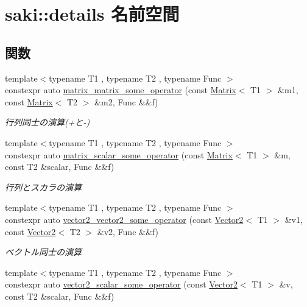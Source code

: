 \hypertarget{namespacesaki_1_1details}{}\section{saki\+:\+:details 名前空間}
\label{namespacesaki_1_1details}
\subsection*{関数}
\begin{DoxyCompactItemize}
\item 
{\footnotesize template$<$typename T1 , typename T2 , typename Func $>$ }\\constexpr auto \mbox{\hyperlink{namespacesaki_1_1details_ab331ad2e5330aa422492d228d522aeea}{matrix\+\_\+matrix\+\_\+some\+\_\+operator}} (const \mbox{\hyperlink{classsaki_1_1_matrix}{Matrix}}$<$ T1 $>$ \&m1, const \mbox{\hyperlink{classsaki_1_1_matrix}{Matrix}}$<$ T2 $>$ \&m2, Func \&\&f)
\begin{DoxyCompactList}\small\item\em 行列同士の演算(+と-\/) \end{DoxyCompactList}\item 
{\footnotesize template$<$typename T1 , typename T2 , typename Func $>$ }\\constexpr auto \mbox{\hyperlink{namespacesaki_1_1details_a3b467138701d036240cfbf728d3a7a2d}{matrix\+\_\+scalar\+\_\+some\+\_\+operator}} (const \mbox{\hyperlink{classsaki_1_1_matrix}{Matrix}}$<$ T1 $>$ \&m, const T2 \&scalar, Func \&\&f)
\begin{DoxyCompactList}\small\item\em 行列とスカラの演算 \end{DoxyCompactList}\item 
{\footnotesize template$<$typename T1 , typename T2 , typename Func $>$ }\\constexpr auto \mbox{\hyperlink{namespacesaki_1_1details_a1e3ab5ffafb707dc8d8b3cf054f3b2e3}{vector2\+\_\+vector2\+\_\+some\+\_\+operator}} (const \mbox{\hyperlink{classsaki_1_1_vector2}{Vector2}}$<$ T1 $>$ \&v1, const \mbox{\hyperlink{classsaki_1_1_vector2}{Vector2}}$<$ T2 $>$ \&v2, Func \&\&f)
\begin{DoxyCompactList}\small\item\em ベクトル同士の演算 \end{DoxyCompactList}\item 
{\footnotesize template$<$typename T1 , typename T2 , typename Func $>$ }\\constexpr auto \mbox{\hyperlink{namespacesaki_1_1details_a8767a64d897787a3b0561939412abb28}{vector2\+\_\+scalar\+\_\+some\+\_\+operator}} (const \mbox{\hyperlink{classsaki_1_1_vector2}{Vector2}}$<$ T1 $>$ \&v, const T2 \&scalar, Func \&\&f)

\end{DoxyCompactItemize}
